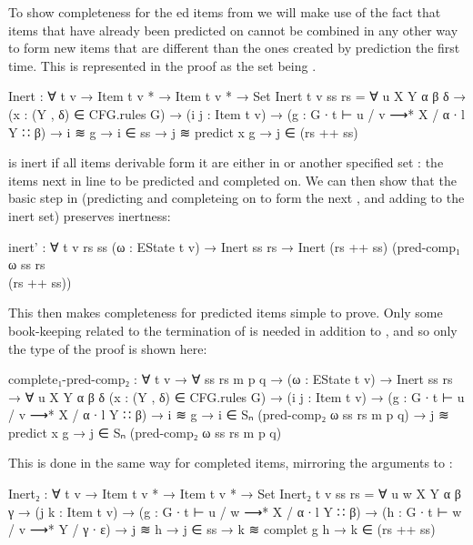 		To show completeness for the ed items from
		 we will make use of the fact that items that have
		already been predicted on cannot be combined in any other way to form
		new items that are different than the ones created by prediction the
		first time. This is represented in the proof as the set 
		being .

		\begin{code}
			Inert : ∀ {t v} → Item t v * → Item t v * → Set
			Inert {t} {v} ss rs =
			  ∀ {u X Y α β δ} →
			  (x : (Y , δ) ∈ CFG.rules G) →
			  (i j : Item t v) →
			  (g : G ∙ t ⊢ u / v ⟶* X / α ∙ l Y ∷ β) →
			  i ≋ g → i ∈ ss →
			  j ≋ predict x g →
			    j ∈ (rs ++ ss)
		\end{code}

		 is inert if all items derivable form it are either in
		 or another specified set : the items next in
		line to be predicted and completed on. We can then show that the basic
		step in  (predicting and completeing on 
		to form the next , and adding  to the inert set)
		preserves inertness:

		\begin{code}
			inert' : ∀ {t v rs ss} (ω : EState t v) →
			  Inert ss rs → Inert (rs ++ ss) (pred-comp₁ ω ss rs \\ (rs ++ ss))
		\end{code}

		This then makes completeness for  predicted items
		simple to prove. Only some book-keeping related to the termination of
		 is needed in addition to , and so
		only the type of the proof is shown here:

		\begin{code}
			complete₁-pred-comp₂ : ∀ {t v} → ∀ ss rs m p q →
			  (ω : EState t v) →
			  Inert ss rs →
			  ∀ {u X Y α β δ}
			  (x : (Y , δ) ∈ CFG.rules G) →
			  (i j : Item t v) →
			  (g : G ∙ t ⊢ u / v ⟶* X / α ∙ l Y ∷ β) →
			  i ≋ g →
			  i ∈ Sₙ (pred-comp₂ ω ss rs m p q) →
			  j ≋ predict x g →
			    j ∈ Sₙ (pred-comp₂ ω ss rs m p q)
		\end{code}

		This is done in the same way for completed items, mirroring the
		arguments to :

		\begin{code}
			Inert₂ : ∀ {t v} → Item t v * → Item t v * → Set
			Inert₂ {t} {v} ss rs =
			  ∀ {u w X Y α β γ} →
			  (j k : Item t v) →
			  (g : G ∙ t ⊢ u / w ⟶* X / α ∙ l Y ∷ β) →
			  (h : G ∙ t ⊢ w / v ⟶* Y / γ ∙ ε) →
			  j ≋ h → j ∈ ss →
			  k ≋ complet g h →
			    k ∈ (rs ++ ss)
		\end{code}

